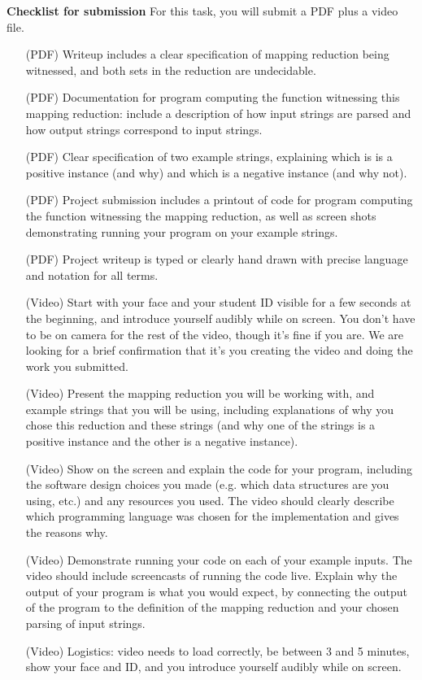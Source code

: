 \documentclass[12pt, oneside]{article}
\begin{document}
\newpage
{\bf Checklist for submission} For this task, you will submit a PDF plus a video file.

\vspace{-10pt}

\begin{itemize}
   \item[(PDF)] Writeup includes a clear specification of mapping reduction being witnessed, and both sets in the reduction are undecidable.
   \item[(PDF)] Documentation for program computing the function witnessing this mapping reduction:
   include a description of how input strings are parsed and how output strings correspond to input strings.
   \item[(PDF)] Clear specification of two example strings, explaining which is is a positive instance (and why) and which is a negative instance (and why not).
   \item[(PDF)] Project submission includes a printout of code for program computing the function witnessing the mapping reduction, as well as screen shots demonstrating running your program on your 
   example strings.
   \item[(PDF)] Project writeup is typed or clearly hand drawn with precise language and notation for all terms.
   \item[(Video)] Start with your face and your student ID visible for a few seconds at the beginning, and introduce yourself audibly while on screen. You don't have to be on camera for the  rest of the video, though it's fine if you are. We are looking for a brief confirmation that  it's you creating the video and doing the work you submitted.
\item[(Video)] Present the mapping reduction you will be working with, and 
example strings that you will be using, including explanations of why you chose this reduction and these strings (and why one of the strings is a positive instance and the other is a negative instance).
\item[(Video)] Show on the screen and explain the code for your program, including the software design choices you made
(e.g. which data structures are you using, etc.) and any resources you used. The video 
should clearly describe which programming language was chosen 
for the implementation and gives the reasons why.
\item[(Video)] Demonstrate running your code on each of your example inputs. The video should include screencasts of 
running the code live.
Explain why the output of your program is what you would expect, by connecting the output of the 
program to the definition of the mapping reduction and your chosen parsing of input strings.
\item[(Video)] Logistics: video needs to load correctly, be between 3 and 5 minutes, 
show your face and ID, and you introduce yourself 
audibly while on screen.
\end{itemize}
\end{document}
